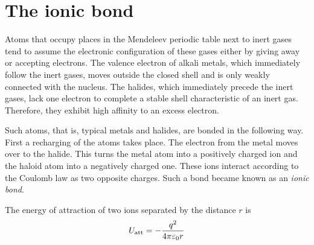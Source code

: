 \begin{table}[!b]
	\renewcommand{\arraystretch}{1.2}
	\caption{}
	\vspace{-0.6cm}
	\label{table:1_2}
	\begin{center}\end{center}
\end{table}

\section{The ionic bond}\label{sec:2}

Atoms that occupy places in the Mendeleev periodic table next to inert gases tend to assume the electronic configuration of these gases either by giving away or accepting electrons. The valence electron of alkali metals, which immediately follow the inert gases, moves outside the closed shell and is only weakly connected with the nucleus. The halides, which immediately precede the inert gases, lack one electron to complete a stable shell characteristic of an inert gas. Therefore, they exhibit high affinity to an excess electron.

Such atoms, that is, typical metals and halides, are bonded in the following way. First a recharging of the atoms takes place. The electron from the metal moves over to the halide. This turns the metal atom into a positively charged ion and the haloid atom into a negatively charged one. These ions interact according to the Coulomb law as two opposite charges. Such a bond became known as an \textit{ionic bond}.

The energy of attraction of two ions separated by the distance $r$ is
\begin{equation}\label{eq:1_6}
	U_{\text{att}} = - \frac{q^2}{4\pi\varepsilon_0 r}
\end{equation}

